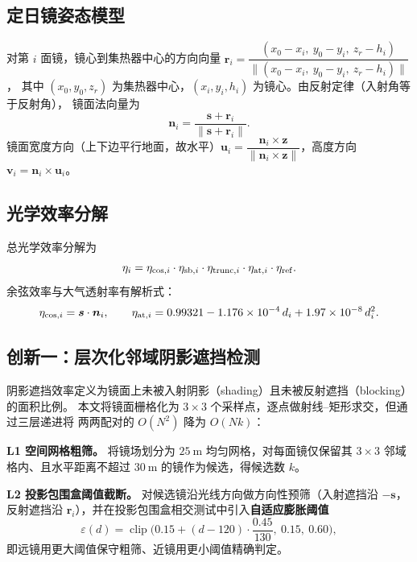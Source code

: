 \documentclass[12pt,a4paper]{ctexart}
\begin{document}
\subsection{定日镜姿态模型}
对第 $i$ 面镜，镜心到集热器中心的方向向量
$\boldsymbol{r}_i = \dfrac{(x_0-x_i,\ y_0-y_i,\ z_r-h_i)}{\|(x_0-x_i,\ y_0-y_i,\ z_r-h_i)\|}$，
其中 $(x_0,y_0,z_r)$ 为集热器中心，$(x_i,y_i,h_i)$ 为镜心。由反射定律（入射角等于反射角），
镜面法向量为
\begin{equation}
  \boldsymbol{n}_i = \frac{\boldsymbol{s} + \boldsymbol{r}_i}{\|\boldsymbol{s}+\boldsymbol{r}_i\|}.
\end{equation}
镜面宽度方向（上下边平行地面，故水平）$\boldsymbol{u}_i = \dfrac{\boldsymbol{n}_i\times\boldsymbol{z}}
{\|\boldsymbol{n}_i\times\boldsymbol{z}\|}$，高度方向 $\boldsymbol{v}_i=\boldsymbol{n}_i\times\boldsymbol{u}_i$。

\subsection{光学效率分解}
总光学效率分解为
\begin{equation}
  \eta_i = \eta_{\cos,i}\cdot\eta_{{\rm sb},i}\cdot\eta_{{\rm trunc},i}\cdot\eta_{{\rm at},i}
  \cdot\eta_{\rm ref}.
\end{equation}
余弦效率与大气透射率有解析式：
\begin{equation}
  \eta_{\cos,i} = \boldsymbol{s}\cdot\boldsymbol{n}_i,
  \qquad
  \eta_{{\rm at},i} = 0.99321 - 1.176\times 10^{-4}\,d_i + 1.97\times 10^{-8}\,d_i^2.
\end{equation}

\subsection{创新一：层次化邻域阴影遮挡检测}
阴影遮挡效率定义为镜面上未被入射阴影（shading）且未被反射遮挡（blocking）的面积比例。
本文将镜面栅格化为 $3\times 3$ 个采样点，逐点做射线--矩形求交，但通过三层递进将
两两配对的 $O(N^2)$ 降为 $O(Nk)$：

\textbf{L1 空间网格粗筛。} 将镜场划分为 $25\ \text{m}$ 均匀网格，对每面镜仅保留其
$3\times 3$ 邻域格内、且水平距离不超过 $30\ \text{m}$ 的镜作为候选，得候选数 $k$。

\textbf{L2 投影包围盒阈值截断。} 对候选镜沿光线方向做方向性预筛（入射遮挡沿 $-\boldsymbol{s}$，
反射遮挡沿 $\boldsymbol{r}_i$），并在投影包围盒相交测试中引入\textbf{自适应膨胀阈值}
\begin{equation}
  \varepsilon(d) = \operatorname{clip}\!\Big(0.15 + (d-120)\cdot\frac{0.45}{130},\ 0.15,\ 0.60\Big),
\end{equation}
即远镜用更大阈值保守粗筛、近镜用更小阈值精确判定。
\end{document}
